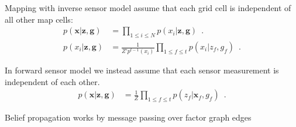 \documentclass[final]{beamer}
\newcommand{\vect}[1]{\mathbf{#1}}
\newcommand{\map}{\vect{x}}
\newcommand{\meas}{z}
\newcommand{\measurements}{\vect{\meas}}
\newcommand{\pose}{g}
\newcommand{\poses}{\vect{\pose}}
\begin{document}
\begin{multicols}{3}
\begin{packedEnumerate}
    \end{packedEnumerate}


    Mapping with inverse sensor model assume that each grid cell is independent of all other map cells: 
    \begin{align}
      p(\map|\measurements, \poses) &= \prod_{1 \le i \le N} p(x_i|\measurements, \poses)
      \enspace. \\
      p(x_i|\measurements, \poses) &= \frac{1}{Z'p^{t-1}(x_i)}\prod_{1\le f \le t} p(x_i|\meas_f, \pose_f)\enspace.
    \end{align}


    In forward sensor model we instead assume that each sensor measurement is independent of each other. 
    \begin{align}
     p(\map | \measurements, \poses) &= \frac{1}{Z} \prod_{1 \le f \le t}
     p(z_f|\map_f, g_f)\enspace.
     \label{eq:modernmap}
    \end{align}

    \vfill\columnbreak

    Belief propagation works by message passing over factor graph edges


\end{multicols}
\end{document}
